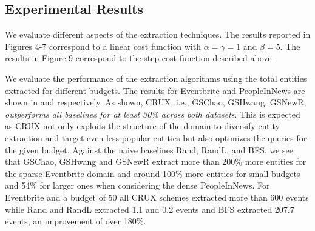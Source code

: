 
\subsection{Experimental Results}
We evaluate different aspects of the extraction techniques. The results reported in Figures 4-7 correspond to a linear cost function with $\alpha=\gamma=1$ and $\beta=5$. The results in Figure 9 correspond to the step cost function described above.

We evaluate the performance of the extraction algorithms using the total entities extracted for different budgets. The results for Eventbrite and PeopleInNews are shown in  and  respectively. As shown, CRUX, i.e., GSChao, GSHwang, GSNewR, {\em outperforms all baselines for at least 30\% across both datasets}. This is expected as CRUX not only exploits the structure of the domain to diversify entity extraction and target even less-popular entities but also optimizes the queries for the given budget. Against the naive baselines Rand, RandL, and BFS, we see that GSChao, GSHwang and GSNewR extract more than 200\% more entities for the sparse Eventbrite domain and around 100\% more entities for small budgets and 54\% for larger ones when considering the dense PeopleInNews. For Eventbrite and a budget of 50 all CRUX schemes extracted more than 600 events while Rand and RandL extracted 1.1 and 0.2 events and BFS extracted 207.7 events, an improvement of over 180\%.

